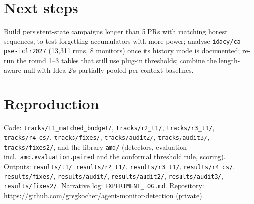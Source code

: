 \documentclass[11pt]{article}
\begin{document}
\section{Next steps}
Build persistent-state campaigns longer than 5 PRs with matching honest sequences, to test forgetting accumulators with more power; analyse \texttt{idacy/ca-pse-iclr2027} (13{,}311 runs, 8 monitors) once its history mode is documented; re-run the round 1--3 tables that still use plug-in thresholds; combine the length-aware null with Idea 2's partially pooled per-context baselines.

\section*{Reproduction}
Code: \texttt{tracks/t1\_matched\_budget/}, \texttt{tracks/r2\_t1/}, \texttt{tracks/r3\_t1/}, \texttt{tracks/r4\_cs/}, \texttt{tracks/fixes/}, \texttt{tracks/audit2/}, \texttt{tracks/audit3/}, \texttt{tracks/fixes2/}, and the library \texttt{amd/} (detectors, evaluation incl.\ \texttt{amd.evaluation.paired} and the conformal threshold rule, scoring). Outputs: \texttt{results/t1/}, \texttt{results/r2\_t1/}, \texttt{results/r3\_t1/}, \texttt{results/r4\_cs/}, \texttt{results/fixes/}, \texttt{results/audit/}, \texttt{results/audit2/}, \texttt{results/audit3/}, \texttt{results/fixes2/}. Narrative log: \texttt{EXPERIMENT\_LOG.md}. Repository: \url{https://github.com/gregkocher/agent-monitor-detection} (private).
\end{document}
